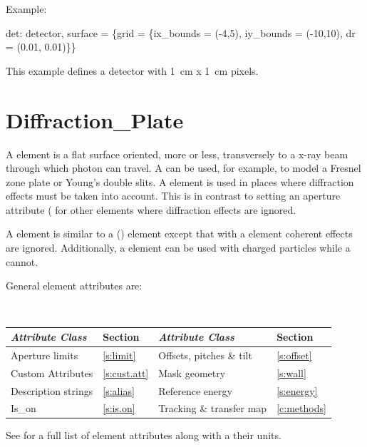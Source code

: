 Example:
\begin{example}
  det: detector, surface = \{grid = 
          \{ix_bounds = (-4,5), iy_bounds = (-10,10), dr = (0.01, 0.01)\}\}
\end{example}
This example defines a detector with 1~cm x 1~cm pixels.

\section{Diffraction_Plate}
\label{s:diff.plate}

A  element is a flat surface oriented, more or
less, transversely to a x-ray beam through which photon can travel. A
 can be used, for example, to model a Fresnel
zone plate or Young's double slits. A  element
is used in places where diffraction effects must be taken into
account. This is in contrast to setting an aperture attribute
( for other elements where diffraction effects are
ignored.

A  element is similar to a 
() element except that with a  element coherent
effects are ignored. Additionally, a  element can be used
with charged particles while a  cannot.

General  element attributes are:
\begin{center}
\tt 
\begin{tabular}{llll} \toprule
  {\sl Attribute Class}      & Section          & {\sl Attribute Class}      & Section         \\ \midrule
  Aperture limits            & \ref{s:limit}    & Offsets, pitches \& tilt   & \ref{s:offset}   \\ 
  Custom Attributes          & \ref{s:cust.att} & Mask geometry              & \ref{s:wall}    \\
  Description strings        & \ref{s:alias}    & Reference energy           & \ref{s:energy}  \\
  Is_on                      & \ref{s:is.on}    & Tracking \& transfer map   & \ref{c:methods} \\
  \bottomrule
\end{tabular}
\end{center}
\toffset
See  for a full list of element attributes along with a their units.

